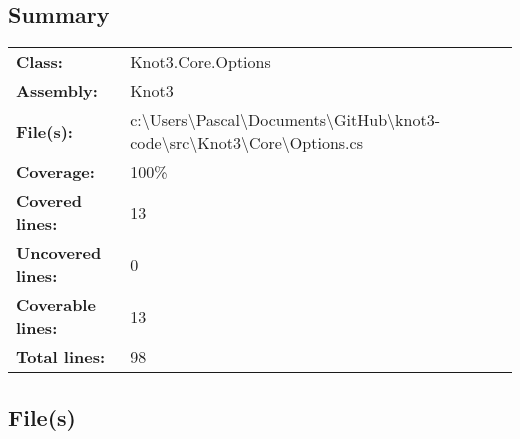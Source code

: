 \documentclass[a4paper,10pt]{article}
\begin{document}
\subsection{Summary}
\begin{longtable}[l]{ll}
\textbf{Class:} & Knot3.Core.Options\\
\textbf{Assembly:} & Knot3\\
\textbf{File(s):} & \begin{minipage}[t]{12cm}{c:\textbackslash Users\textbackslash Pascal\textbackslash Documents\textbackslash GitHub\textbackslash knot3-code\textbackslash src\textbackslash Knot3\textbackslash Core\textbackslash Options.cs}\end{minipage} \\
\textbf{Coverage:} & 100\%\\
\textbf{Covered lines:} & 13\\
\textbf{Uncovered lines:} & 0\\
\textbf{Coverable lines:} & 13\\
\textbf{Total lines:} & 98\\
\end{longtable}
\subsection{File(s)}
\end{document}
